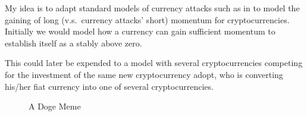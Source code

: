 \documentclass[a4paper]{report}
\begin{document}
\begin{refsection}
My idea is to adapt standard models of currency attacks such as in \textcite{obstfeld1986rational,obstfeld1995logic,obstfeld1996models} to model the gaining of long (v.s.~currency attacks' short) momentum for cryptocurrencies. Initially we would model how a currency can gain sufficient momentum to establish itself as a stably above zero.

This could later be expended to a model with several cryptocurrencies competing for the investment of the same new cryptocurrency adopt, who is converting his/her fiat currency into one of several cryptocurrencies.

\begin{figure}
\caption{A Doge Meme}
\label{doge}
\end{figure}

\printbibliography
\end{refsection}
\end{document}
